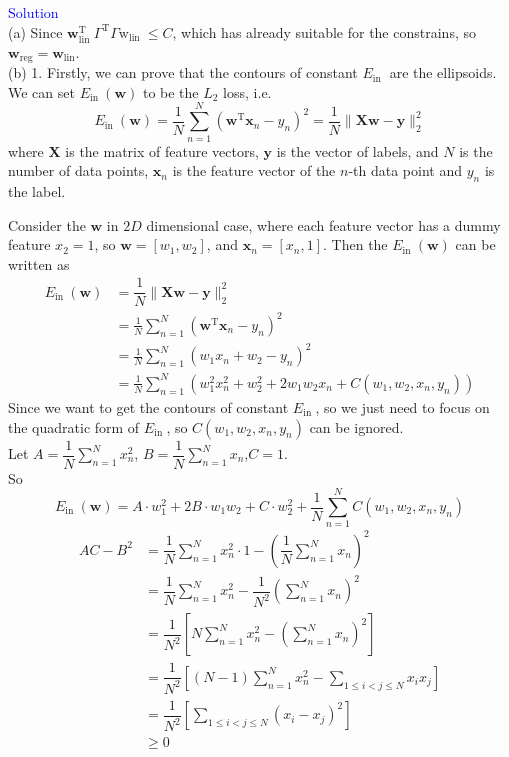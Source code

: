 \textcolor{blue}{Solution}\\
(a) Since $\mathbf{w}_{\text {lin }}^{\mathrm{T}} \Gamma^{\mathrm{T}} \Gamma \mathrm{w}_{\text {lin }} \leq C$, which has already suitable for the constrains, so $\mathbf{w}_{\text{reg}}=\mathbf{w}_{\text{lin}}$.\\
(b) 1. Firstly, we can prove that the contours of constant $E_{\text {in }}$ are the ellipsoids.\\
We can set $E_{\text {in }}(\mathbf{w})$ to be the $L_2$ loss, i.e.
$$E_{\text {in }}(\mathbf{w})=\frac{1}{N} \sum_{n=1}^{N}\left(\mathbf{w}^{\mathrm{T}} \mathbf{x}_{n}-y_{n}\right)^{2}=\dfrac{1}{N}\|\mathbf{Xw}-\mathbf{y}\|_2^2$$
where $\mathbf{X}$ is the matrix of feature vectors, $\mathbf{y}$ is the vector of labels, and $N$ is the number of data points, $\mathbf{x}_{n}$ is the feature vector of the $n$-th data point and $y_{n}$ is the label.

Consider the $\mathbf{w}$ in $2D$ dimensional case, where each feature vector has a dummy feature $x_2=1$, so $\mathbf{w}=\left[w_1,w_2\right]$, and $\mathbf{x}_n=\left[x_{n},1\right]$. Then the $E_{\text {in }}(\mathbf{w})$ can be written as
\begin{align*}
    E_{\text {in }}(\mathbf{w}) &= \dfrac{1}{N}\|\mathbf{Xw}-\mathbf{y}\|_2^2 \\
    &= \frac{1}{N} \sum_{n=1}^{N}\left(\mathbf{w}^{\mathrm{T}} \mathbf{x}_{n}-y_{n}\right)^{2} \\
    &= \frac{1}{N} \sum_{n=1}^{N}\left(w_1x_{n}+w_2-y_{n}\right)^{2} \\
    &= \frac{1}{N} \sum_{n=1}^{N}(w_1^2x_n^2+w_2^2+2w_1w_2x_n+C(w_1,w_2,x_n,y_n))
\end{align*}
Since we want to get the contours of constant $E_{\text {in }}$, so we just need to focus on the quadratic form of $E_{\text {in }}$, so $C(w_1,w_2,x_n,y_n)$ can be ignored.\\
Let $A=\dfrac{1}{N}\sum\limits_{n=1}^{N}x_n^2$, $B=\dfrac{1}{N}\sum\limits_{n=1}^{N}x_n$,$C=1$.\\
So 
$$E_{\text {in }}(\mathbf{w})=A\cdot w_1^2+2B\cdot w_1w_2+C\cdot w_2^2+\frac{1}{N} \sum_{n=1}^{N}C(w_1,w_2,x_n,y_n)$$
\begin{align*}
    AC-B^2 &= \dfrac{1}{N}\sum_{n=1}^{N}x_n^2\cdot 1-\left(\dfrac{1}{N}\sum_{n=1}^{N}x_n\right)^2 \\
    &= \dfrac{1}{N}\sum_{n=1}^{N}x_n^2-\dfrac{1}{N^2}\left(\sum_{n=1}^{N}x_n\right)^2 \\
    &= \dfrac{1}{N^2}\left[N\sum_{n=1}^{N}x_n^2-\left(\sum_{n=1}^{N}x_n\right)^2\right] \\
    &= \dfrac{1}{N^2}\left[(N-1)\sum_{n=1}^{N}x_n^2-\sum_{1\leq i<j\leq N}x_ix_j\right] \\
    &= \dfrac{1}{N^2}\left[\sum_{1\leq i<j\leq N}(x_i-x_j)^2\right] \\
    &\geq 0
\end{align*}

